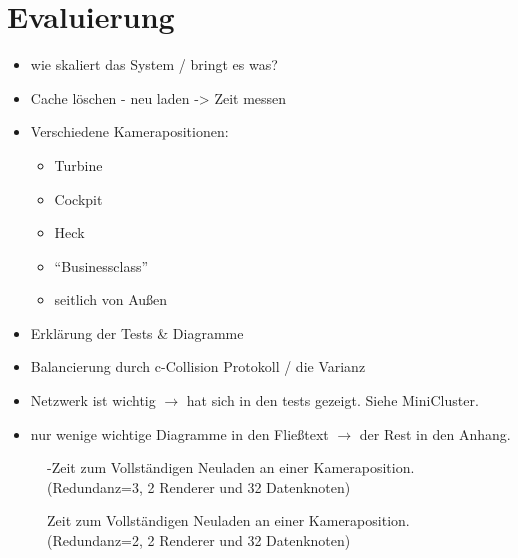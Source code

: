\chapter{Evaluierung}
\label{chap:eval}
%
\begin{itemize}
 \item wie skaliert das System / bringt es was?
 \item Cache löschen - neu laden -> Zeit messen
 \item Verschiedene Kamerapositionen:
 \begin{itemize}
  \item Turbine
  \item Cockpit
  \item Heck
  \item ``Businessclass''
  \item seitlich von Außen
 \end{itemize}
 \item Erklärung der Tests \& Diagramme
 \item Balancierung durch c-Collision Protokoll / die Varianz
 \item Netzwerk ist wichtig $\rightarrow$ hat sich in den tests gezeigt. Siehe MiniCluster.
 \item nur wenige wichtige Diagramme in den Fließtext $\rightarrow$ der Rest in den Anhang.
\end{itemize}
%
%


\begin{figure}
\centering

  \caption{\label{fig:eval:reaload1}-Zeit zum Vollständigen Neuladen an einer Kameraposition. (Redundanz=3, 2 Renderer und 32 Datenknoten)}
\end{figure}

\begin{figure}
\centering

  \caption{\label{fig:eval:reload2}Zeit zum Vollständigen Neuladen an einer Kameraposition. (Redundanz=2, 2 Renderer und 32 Datenknoten)}
\end{figure}
%


